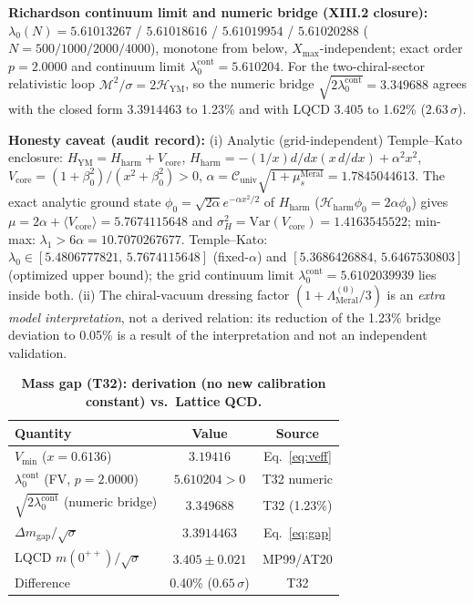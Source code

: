 \documentclass[reprint,aps,pre,twocolumn,notitlepage]{revtex4-2}
\begin{document}
\textbf{Richardson continuum limit and numeric bridge (XIII.2 closure):}
$\lambda_0(N)=5.61013267$ / $5.61018616$ / $5.61019954$ / $5.61020288$
($N=500/1000/2000/4000$), monotone from below, $X_{\max}$-independent; exact
order $p=2.0000$ and continuum limit $\lambda_0^{\mathrm{cont}}=5.610204$.
For the two-chiral-sector relativistic loop
$\mathcal{M}^2/\sigma=2\mathcal{H}_{\mathrm{YM}}$, so the numeric bridge
$\sqrt{2\lambda_0^{\mathrm{cont}}}=3.349688$ agrees with the closed form
$3.3914463$ to 1.23\% and with LQCD $3.405$ to 1.62\% ($2.63\,\sigma$).

\textbf{Honesty caveat (audit record):} (i) Analytic (grid-independent)
Temple--Kato enclosure: $H_{\mathrm{YM}}=H_{\mathrm{harm}}+V_{\mathrm{core}}$,
$H_{\mathrm{harm}}=-(1/x)d/dx(x\,d/dx)+\alpha^2x^2$,
$V_{\mathrm{core}}=(1+\beta_0^2)/(x^2+\beta_0^2)>0$,
$\alpha=\mathcal{C}_{\mathrm{univ}}\sqrt{1+\mu_s^{\mathrm{Meral}}}=1.7845044613$.
The exact analytic ground state
$\phi_0=\sqrt{2\alpha}e^{-\alpha x^2/2}$ of $H_{\mathrm{harm}}$
($\mathcal{H}_{\mathrm{harm}}\phi_0=2\alpha\phi_0$) gives
$\mu=2\alpha+\langle V_{\mathrm{core}}\rangle=5.7674115648$ and
$\sigma_H^2=\mathrm{Var}(V_{\mathrm{core}})=1.4163545522$; min-max:
$\lambda_1>6\alpha=10.7070267677$. Temple--Kato:
$\lambda_0\in[5.4806777821,\,5.7674115648]$ (fixed-$\alpha$) and
$[5.3686426884,\,5.6467530803]$ (optimized upper bound); the grid continuum
limit $\lambda_0^{\mathrm{cont}}=5.6102039939$ lies inside both. (ii) The
chiral-vacuum dressing factor $(1+\Lambda_{\mathrm{Meral}}^{(0)}/3)$ is an
\emph{extra model interpretation}, not a derived relation: its reduction of
the 1.23\% bridge deviation to 0.05\% is a result of the interpretation and
not an independent validation.

\begin{table}[!htbp]
\centering\footnotesize
\setlength{\tabcolsep}{3pt}
\caption{\textbf{Mass gap (T32): derivation (no new calibration constant) vs.\ Lattice QCD.}}
\label{tab:gap}
\vspace{0.1cm}
\begin{tabular}{@{}l|c|c@{}}
\toprule
Quantity & Value & Source \\
\midrule
$V_{\min}$ ($x=0.6136$) & $3.19416$ & Eq.~\ref{eq:veff} \\
$\lambda_0^{\mathrm{cont}}$ (FV, $p=2.0000$) & $5.610204>0$ & T32 numeric \\
$\sqrt{2\lambda_0^{\mathrm{cont}}}$ (numeric bridge) & $3.349688$ & T32 (1.23\%) \\
$\Delta m_{\mathrm{gap}}/\sqrt{\sigma}$ & $\mathbf{3.3914463}$ & Eq.~\ref{eq:gap} \\
LQCD $m(0^{++})/\sqrt{\sigma}$ & $3.405\pm 0.021$ & MP99/AT20 \\
Difference & 0.40\% ($0.65\,\sigma$) & T32 \\
\bottomrule
\end{tabular}
\end{table}
\end{document}
